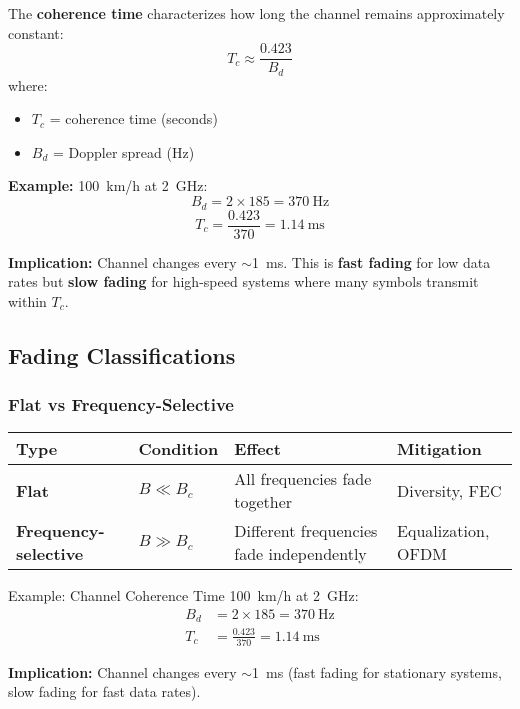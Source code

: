 The \textbf{coherence time} characterizes how long the channel remains approximately constant:
\begin{equation}
T_c \approx \frac{0.423}{B_d}
\end{equation}
where:
\begin{itemize}
\item $T_c$ = coherence time (seconds)
\item $B_d$ = Doppler spread (Hz)
\end{itemize}

\textbf{Example:} 100~km/h at 2~GHz:
\begin{equation}
B_d = 2 \times 185 = 370~\text{Hz}
\end{equation}
\begin{equation}
T_c = \frac{0.423}{370} = 1.14~\text{ms}
\end{equation}

\textbf{Implication:} Channel changes every $\sim$1~ms. This is \textbf{fast fading} for low data rates but \textbf{slow fading} for high-speed systems where many symbols transmit within $T_c$.

\subsection{Fading Classifications}\label{fading-classifications}

\subsubsection{Flat vs Frequency-Selective}\label{flat-vs-frequency-selective}

\begin{center}
\begin{tabular}{@{}llll@{}}
\toprule
\textbf{Type} & \textbf{Condition} & \textbf{Effect} & \textbf{Mitigation} \\
\midrule
\textbf{Flat} & $B \ll B_c$ & All frequencies fade together & Diversity, FEC \\
\textbf{Frequency-selective} & $B \gg B_c$ & Different frequencies fade independently & Equalization, OFDM \\
\bottomrule
\end{tabular}
\end{center}

\begin{calloutbox}{Example: Channel Coherence Time}
100~km/h at 2~GHz:
\begin{align*}
B_d &= 2 \times 185 = 370~\text{Hz} \\
T_c &= \frac{0.423}{370} = 1.14~\text{ms}
\end{align*}

\textbf{Implication:} Channel changes every $\sim$1~ms (fast fading for stationary systems, slow fading for fast data rates).
\end{calloutbox}

